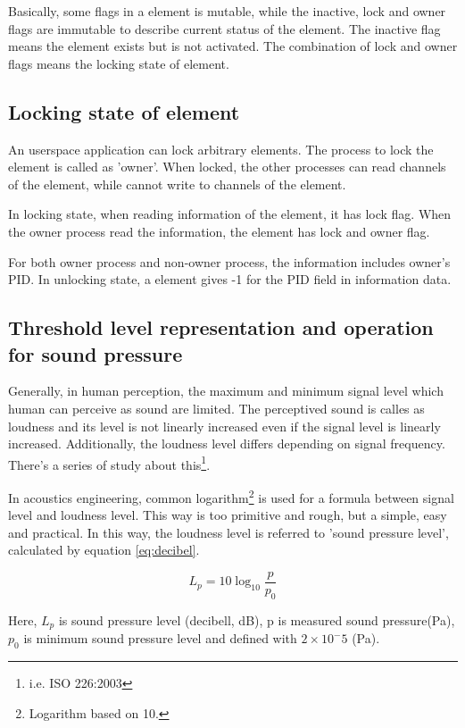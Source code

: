 \documentclass[onecolumn]{article}
\begin{document}
Basically, some flags in a element is mutable, while the inactive, lock and owner flags are immutable to describe current status of the element. The inactive flag means the element exists but is not activated. The combination of lock and owner flags means the locking state of element.


\subsection{Locking state of element}

An userspace application can lock arbitrary elements. The process to lock the element is called as 'owner'. When locked, the other processes can read channels of the element, while cannot write to channels of the element.

In locking state, when reading information of the element, it has lock flag. When the owner process read the information, the element has lock and owner flag.

For both owner process and non-owner process, the information includes owner's PID. In unlocking state, a element gives -1 for the PID field in information data.


\subsection{Threshold level representation and operation for sound pressure}

Generally, in human perception, the maximum and minimum signal level which human can perceive as sound are limited. The perceptived sound is calles as loudness and its level is not linearly increased even if the signal level is linearly increased. Additionally, the loudness level differs depending on signal frequency. There's a series of study about this\footnote{i.e. ISO 226:2003}.

In acoustics engineering, common logarithm\footnote{Logarithm based on 10.} is used for a formula between signal level and loudness level. This way is too primitive and rough, but a simple, easy and practical. In this way, the loudness level is referred to 'sound pressure level', calculated by equation \ref{eq:decibel}.

\begin{equation}
L_p = 10 \log_{10} \frac{p}{p_0} \label{eq:decibel}
\end{equation}

Here, $L_p$ is sound pressure level (decibell, dB), p is measured sound pressure(Pa), $p_0$ is minimum sound pressure level and defined with $2 \times 10^-5$ (Pa).
\end{document}
